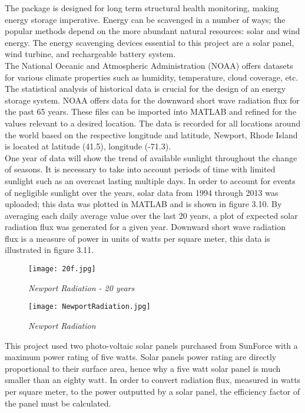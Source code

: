 \indent The package is designed for long term structural health monitoring, making energy storage imperative. 
Energy can be scavenged in a number of ways; the popular methods depend on the more abundant natural resources: solar and wind energy. 
The energy scavenging devices essential to this project are a solar panel, wind turbine, and rechargeable battery system.\\

\indent The National Oceanic and Atmospheric Administration (NOAA) offers datasets for various climate properties such as humidity, temperature, cloud coverage, etc. 
The statistical analysis of historical data is crucial for the design of an energy storage system. 
NOAA offers data for the downward short wave radiation flux for the past 65 years. 
These files can be imported into MATLAB and refined for the values relevant to a desired location. 
The data is recorded for all locations around the world based on the respective longitude and latitude, Newport, Rhode Island is located at latitude (41.5), longitude (-71.3). \\

\indent One year of data will show the trend of available sunlight throughout the change of seasons. 
It is necessary to take into account periods of time with limited sunlight such as an overcast lasting multiple days. 
In order to account for events of negligible sunlight over the years, solar data from 1994 through 2013 was uploaded; this data was plotted in MATLAB and is shown in figure 3.10.
By averaging each daily average value over the last 20 years, a plot of expected solar radiation flux was generated for a given year. 
Downward short wave radiation flux is a measure of power in units of watts per square meter, this data is illustrated in figure 3.11.

\begin{figure}[H]
\centering
\texttt{[image: 20f.jpg]}
\caption{\textit{Newport Radiation - 20 years}}
\label{fig:20 NewportRadtiation}
\end{figure}
\begin{figure}[H]
\centering
\texttt{[image: NewportRadiation.jpg]}
\caption{\textit{Newport Radiation}}
\label{fig:NewportRadtiation}
\end{figure}

\indent This project used two photo-voltaic solar panels purchased from SunForce with a maximum power rating of five watts.
Solar panels power rating are directly proportional to their surface area, hence why a five watt solar panel is much smaller than an eighty watt. 
In order to convert radiation flux, measured in watts per square meter, to the power outputted by a solar panel, the efficiency factor of the panel must be calculated.


